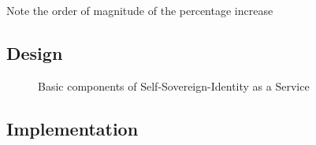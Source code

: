 \faEye\enspace Note the order of magnitude of the percentage increase

\subsection{Design}

\begin{figure}[!h]
    \centering
    
    \caption{Basic components of Self-Sovereign-Identity as a Service}
    \label{poc-design}
\end{figure}
\subsection{Implementation}
